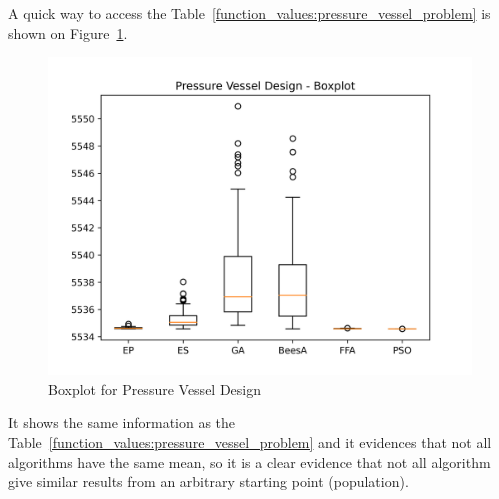 A quick way to access the Table~\ref{function_values:pressure_vessel_problem} is shown on Figure~\ref{fig:pressure_vessel_design_boxplot}.

\begin{figure}[H]
\centering
\caption{Boxplot for Pressure Vessel Design}
\label{fig:pressure_vessel_design_boxplot}
\includegraphics[scale=0.5]{images/pressure_vessel_problem_boxplot.png}
\end{figure}

It shows the same information as the Table~\ref{function_values:pressure_vessel_problem}
and it evidences that not all algorithms have the same mean, so it is a clear evidence
that not all algorithm give similar results from an arbitrary starting point (population).

